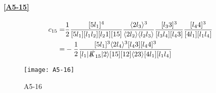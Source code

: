 \paragraph{\ref{A5-15}}
\begin{equation*}
\begin{split}
c_{15} = &
\frac{1}{2}
\frac{[5l_1]^4}{[5l_1][l_1  l_2][l_2 1][15]}
\frac{\langle 2 l_3\rangle^3}{\langle 2 l_2 \rangle\langle l_2 l_3\rangle}
\frac{[l_3 3 ]^3}{[l_3 l_4][l_4 3]}
\frac{[l_4 4]^3}{[4l_1][l_1 l_4]}
\\
= &
-\frac{1}{2}
\frac{[5l_1]^3\langle 2l_4\rangle^3[l_4 3][l_4 4]^3}{[l_1|\slashed{K}_{15}|2\rangle [15][12]\langle 23\rangle[4l_1][l_1l_4]}
\end{split}
\end{equation*}
%
%
\fi %
%
\begin{figure}
  \centering
    \texttt{[image: A5-16]}
    \caption{A5-16}
  \label{A5-16}
\end{figure}
